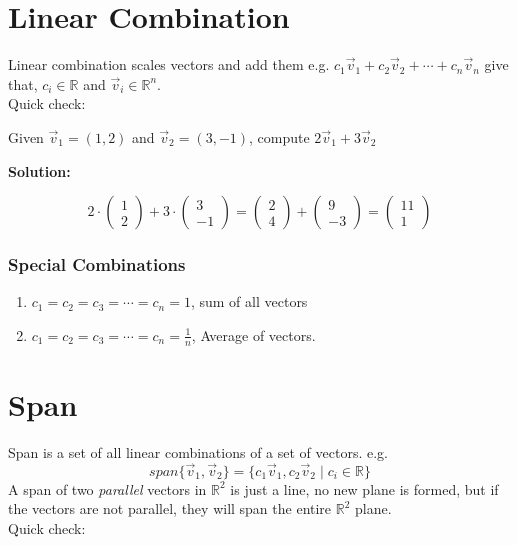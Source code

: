 \documentclass[11pt]{article}
\begin{document}
\section{Linear Combination}
Linear combination scales vectors and add them e.g. $c_1\vec v_1 + c_2\vec v_2 + \cdots + c_n \vec v_n$ give that, $c_i \in \mathbb{R}$ and $\vec v_i \in \mathbb{R}^n$. \\[0.1in]
Quick check: 

Given $\vec v_1 = (1, 2)$  and $\vec v_2 = (3, -1)$, compute $2\vec v_1 + 3 \vec v_2$

\begin{center}
\textbf{Solution:}
\end{center}

\[
2\cdot
\begin{pmatrix}
1 \\ 2
\end{pmatrix}
+
3 \cdot
\begin{pmatrix}
3\\-1
\end{pmatrix}
=
\begin{pmatrix}
2 \\4
\end{pmatrix}
+
\begin{pmatrix}
9 \\-3
\end{pmatrix}
=
\begin{pmatrix}
11\\ 1
\end{pmatrix}
\]
\subsubsection*{Special Combinations}
\begin{enumerate}
\item $c_ 1 = c_2 = c_3 = \cdots = c_n = 1$, sum of all vectors
\item $c_ 1 = c_2 = c_3 = \cdots = c_n = \frac{1}{n}$, Average of vectors.
\end{enumerate}
\section{Span}
Span is a set of all linear combinations of a set of vectors. e.g. 
\[
span\{\vec v_1, \vec v_2\} = \{c_1 \vec v_1, c_2 \vec v_2\mid c_i \in \mathbb{R}\}
\]
A span of two \textit{parallel} vectors in $\mathbb{R}^2$ is just a line, no new plane is formed, but if the vectors are not parallel, they will span the entire $\mathbb{R}^2$ plane.\\[0.1in]
Quick check:
\end{document}

